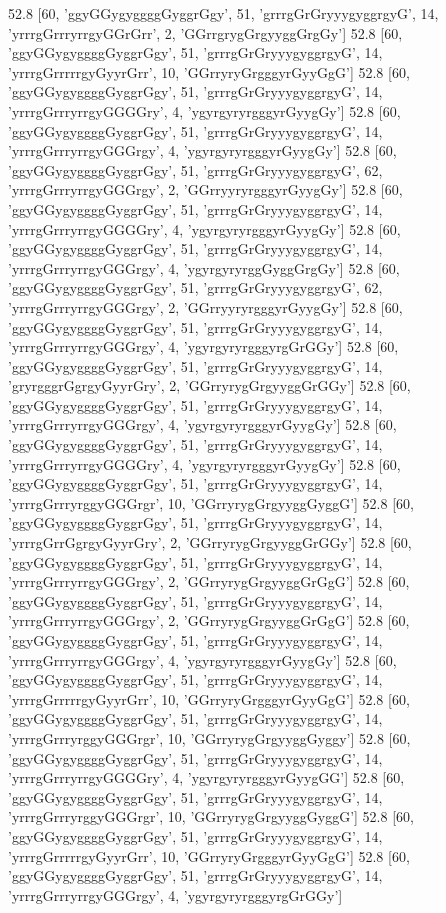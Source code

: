 52.8 [60, 'ggyGGygyggggGyggrGgy', 51, 'grrrgGrGryyygyggrgyG', 14, 'yrrrgGrrryrrgyGGrGrr', 2, 'GGrrgrygGrgyyggGrgGy']
52.8 [60, 'ggyGGygyggggGyggrGgy', 51, 'grrrgGrGryyygyggrgyG', 14, 'yrrrgGrrrrrgyGyyrGrr', 10, 'GGrryryGrgggyrGyyGgG']
52.8 [60, 'ggyGGygyggggGyggrGgy', 51, 'grrrgGrGryyygyggrgyG', 14, 'yrrrgGrrryrrgyGGGGry', 4, 'ygyrgyryrgggyrGyygGy']
52.8 [60, 'ggyGGygyggggGyggrGgy', 51, 'grrrgGrGryyygyggrgyG', 14, 'yrrrgGrrryrrgyGGGrgy', 4, 'ygyrgyryrgggyrGyygGy']
52.8 [60, 'ggyGGygyggggGyggrGgy', 51, 'grrrgGrGryyygyggrgyG', 62, 'yrrrgGrrryrrgyGGGrgy', 2, 'GGrryyryrgggyrGyygGy']
52.8 [60, 'ggyGGygyggggGyggrGgy', 51, 'grrrgGrGryyygyggrgyG', 14, 'yrrrgGrrryrrgyGGGGry', 4, 'ygyrgyryrgggyrGyygGy']
52.8 [60, 'ggyGGygyggggGyggrGgy', 51, 'grrrgGrGryyygyggrgyG', 14, 'yrrrgGrrryrrgyGGGrgy', 4, 'ygyrgyryrggGyggGrgGy']
52.8 [60, 'ggyGGygyggggGyggrGgy', 51, 'grrrgGrGryyygyggrgyG', 62, 'yrrrgGrrryrrgyGGGrgy', 2, 'GGrryyryrgggyrGyygGy']
52.8 [60, 'ggyGGygyggggGyggrGgy', 51, 'grrrgGrGryyygyggrgyG', 14, 'yrrrgGrrryrrgyGGGrgy', 4, 'ygyrgyryrgggyrgGrGGy']
52.8 [60, 'ggyGGygyggggGyggrGgy', 51, 'grrrgGrGryyygyggrgyG', 14, 'gryrgggrGgrgyGyyrGry', 2, 'GGrryrygGrgyyggGrGGy']
52.8 [60, 'ggyGGygyggggGyggrGgy', 51, 'grrrgGrGryyygyggrgyG', 14, 'yrrrgGrrryrrgyGGGrgy', 4, 'ygyrgyryrgggyrGyygGy']
52.8 [60, 'ggyGGygyggggGyggrGgy', 51, 'grrrgGrGryyygyggrgyG', 14, 'yrrrgGrrryrrgyGGGGry', 4, 'ygyrgyryrgggyrGyygGy']
52.8 [60, 'ggyGGygyggggGyggrGgy', 51, 'grrrgGrGryyygyggrgyG', 14, 'yrrrgGrrryrggyGGGrgr', 10, 'GGrryrygGrgyyggGyggG']
52.8 [60, 'ggyGGygyggggGyggrGgy', 51, 'grrrgGrGryyygyggrgyG', 14, 'yrrrgGrrGgrgyGyyrGry', 2, 'GGrryrygGrgyyggGrGGy']
52.8 [60, 'ggyGGygyggggGyggrGgy', 51, 'grrrgGrGryyygyggrgyG', 14, 'yrrrgGrrryrrgyGGGrgy', 2, 'GGrryrygGrgyyggGrGgG']
52.8 [60, 'ggyGGygyggggGyggrGgy', 51, 'grrrgGrGryyygyggrgyG', 14, 'yrrrgGrrryrrgyGGGrgy', 2, 'GGrryrygGrgyyggGrGgG']
52.8 [60, 'ggyGGygyggggGyggrGgy', 51, 'grrrgGrGryyygyggrgyG', 14, 'yrrrgGrrryrrgyGGGrgy', 4, 'ygyrgyryrgggyrGyygGy']
52.8 [60, 'ggyGGygyggggGyggrGgy', 51, 'grrrgGrGryyygyggrgyG', 14, 'yrrrgGrrrrrgyGyyrGrr', 10, 'GGrryryGrgggyrGyyGgG']
52.8 [60, 'ggyGGygyggggGyggrGgy', 51, 'grrrgGrGryyygyggrgyG', 14, 'yrrrgGrrryrggyGGGrgr', 10, 'GGrryrygGrgyyggGyggy']
52.8 [60, 'ggyGGygyggggGyggrGgy', 51, 'grrrgGrGryyygyggrgyG', 14, 'yrrrgGrrryrrgyGGGGry', 4, 'ygyrgyryrgggyrGyygGG']
52.8 [60, 'ggyGGygyggggGyggrGgy', 51, 'grrrgGrGryyygyggrgyG', 14, 'yrrrgGrrryrggyGGGrgr', 10, 'GGrryrygGrgyyggGyggG']
52.8 [60, 'ggyGGygyggggGyggrGgy', 51, 'grrrgGrGryyygyggrgyG', 14, 'yrrrgGrrrrrgyGyyrGrr', 10, 'GGrryryGrgggyrGyyGgG']
52.8 [60, 'ggyGGygyggggGyggrGgy', 51, 'grrrgGrGryyygyggrgyG', 14, 'yrrrgGrrryrrgyGGGrgy', 4, 'ygyrgyryrgggyrgGrGGy']
